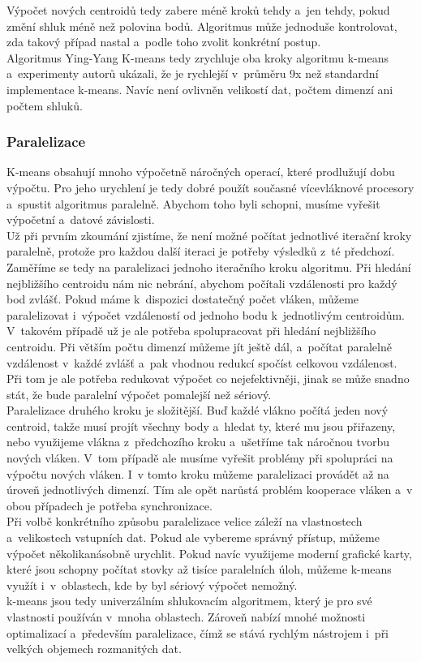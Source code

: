 Výpočet nových centroidů tedy zabere méně kroků tehdy a~jen tehdy, pokud změní shluk méně než polovina bodů. Algoritmus může jednoduše kontrolovat, zda takový případ nastal a~podle toho zvolit konkrétní postup.\\

Algoritmus Ying-Yang K-means tedy zrychluje oba kroky algoritmu k-means a~experimenty autorů ukázali, že je rychlejší v~průměru 9x než standardní implementace k-means. Navíc není ovlivněn velikostí dat, počtem dimenzí ani počtem shluků.

\subsubsection{Paralelizace}
K-means obsahují mnoho výpočetně náročných operací, které prodlužují dobu výpočtu. Pro jeho urychlení je tedy dobré použít současné vícevláknové procesory a~spustit algoritmus paralelně. Abychom toho byli schopni, musíme vyřešit výpočetní a~datové závislosti.\\

Už při prvním zkoumání zjistíme, že není možné počítat jednotlivé iterační kroky paralelně, protože pro každou další iteraci je potřeby výsledků z~té předchozí. Zaměříme se tedy na paralelizaci jednoho iteračního kroku algoritmu. Při hledání nejbližšího centroidu nám nic nebrání, abychom počítali vzdálenosti pro každý bod zvlášť. Pokud máme k~dispozici dostatečný počet vláken, můžeme paralelizovat i~výpočet vzdáleností od jednoho bodu k~jednotlivým centroidům. V~takovém případě už je ale potřeba spolupracovat při hledání nejbližšího centroidu. Při větším počtu dimenzí můžeme jít ještě dál, a~počítat paralelně vzdálenost v~každé zvlášť a~pak vhodnou redukcí spočíst celkovou vzdálenost. Při tom je ale potřeba redukovat výpočet co nejefektivněji, jinak se může snadno stát, že bude paralelní výpočet pomalejší než sériový.\\

Paralelizace druhého kroku je složitější. Buď každé vlákno počítá jeden nový centroid, takže musí projít všechny body a~hledat ty, které mu jsou přiřazeny, nebo využijeme vlákna z~předchozího kroku a~ušetříme tak náročnou tvorbu nových vláken. V~tom případě ale musíme vyřešit problémy při spolupráci na výpočtu nových vláken. I~v tomto kroku můžeme paralelizaci provádět až na úroveň jednotlivých dimenzí. Tím ale opět narůstá problém kooperace vláken a~v obou případech je potřeba synchronizace.\\

Při volbě konkrétního způsobu paralelizace velice záleží na vlastnostech a~velikostech vstupních dat. Pokud ale vybereme správný přístup, můžeme výpočet několikanásobně urychlit. Pokud navíc využijeme moderní grafické karty, které jsou schopny počítat stovky až tisíce paralelních úloh, můžeme k-means využít i~v~oblastech, kde by byl sériový výpočet nemožný.\\

k-means jsou tedy univerzálním shlukovacím algoritmem, který je pro své vlastnosti používán v~mnoha oblastech. Zároveň nabízí mnohé možnosti optimalizací a~především paralelizace, čímž se stává rychlým nástrojem i~při velkých objemech rozmanitých dat.